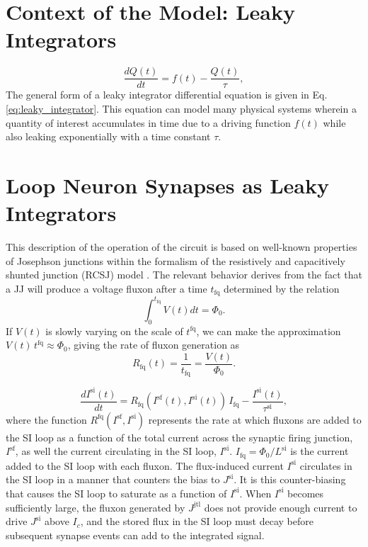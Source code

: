 \documentclass[twocolumn]{article}
\begin{document}
\section{\label{sec:leaky_integrators}Context of the Model: Leaky Integrators}
\begin{equation}
\label{eq:leaky_integrator}
\frac{dQ(t)}{dt} = f(t)-\frac{Q(t)}{\tau},
\end{equation}
The general form of a leaky integrator differential equation is given in Eq.\,\ref{eq:leaky_integrator}. This equation can model many physical systems wherein a quantity of interest accumulates in time due to a driving function $f(t)$ while also leaking exponentially with a time constant $\tau$. 


\section{\label{sec:synapses}Loop Neuron Synapses as Leaky Integrators}


This description of the operation of the circuit is based on well-known properties of Josephson junctions within the formalism of the resistively and capacitively shunted junction (RCSJ) model \cite{vatu1998,ka1999,ti1996}. The relevant behavior derives from the fact that a JJ will produce a voltage fluxon after a time $t_{\mathrm{fq}}$ determined by the relation
\begin{equation}
\label{eq:jj__fluxon_production}
\int_0^{t_{\mathrm{fq}}}V(t)dt = \Phi_0.
\end{equation}
If $V(t)$ is slowly varying on the scale of $t^{\mathrm{fq}}$, we can make the approximation $V(t)\,t^{\mathrm{fq}} \approx \Phi_0$, giving the rate of fluxon generation as
\begin{equation}
\label{eq:jj__fluxon_rate}
R_{\mathrm{fq}}(t) =  \frac{1}{t_{\mathrm{fq}}} = \frac{V(t)}{\Phi_0}.
\end{equation}

\begin{equation}
\label{eq:synapses__leaky_integrator}
\frac{dI^{\mathrm{si}}(t)}{dt} = R_{\mathrm{fq}}\left(I^{\mathrm{sf}}(t),I^{\mathrm{si}}(t)\right)\,I_{\mathrm{fq}} -\frac{I^{\mathrm{si}}(t)}{\tau^{\mathrm{si}}},
\end{equation}
where the function $R^{\mathrm{fq}}\left(I^{\mathrm{sf}},I^{\mathrm{si}}\right)$ represents the rate at which fluxons are added to the SI loop as a function of the total current across the synaptic firing junction, $I^{\mathrm{sf}}$, as well the current circulating in the SI loop, $I^{\mathrm{si}}$. $I_{\mathrm{fq}} = \Phi_0/L^{\mathrm{si}}$ is the current added to the SI loop with each fluxon. The flux-induced current $I^{\mathrm{si}}$ circulates in the SI loop in a manner that counters the bias to $J^{\mathrm{si}}$. It is this counter-biasing that causes the SI loop to saturate as a function of $I^{\mathrm{si}}$. When $I^{\mathrm{si}}$ becomes sufficiently large, the fluxon generated by $J^{\mathrm{jtl}}$ does not provide enough current to drive $J^{\mathrm{si}}$ above $I_c$, and the stored flux in the SI loop must decay before subsequent synapse events can add to the integrated signal.
\end{document}
